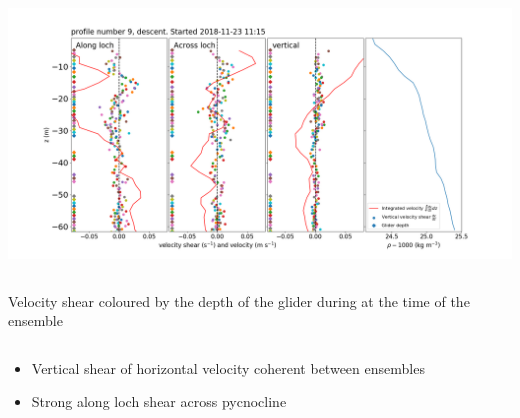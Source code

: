 \documentclass[unknownkeysallowed,usepdftitle=false]{beamer}
\newcommand{\secvariable}{nothing}
\newcommand{\mysection}[1]{\renewcommand{\secvariable}{#1}
}
\begin{document}
\mysection{trial_shear}
\begin{frame}\label{\secvariable}
\includegraphics[trim=70 20 80 80,clip,width=\paperwidth]{figure/95_qc.png}
\vspace*{-5mm}
\begin{columns}
\begin{column}[t]{0.9\textwidth}

\scriptsize Velocity shear coloured by the depth of the glider during at the time of the ensemble
\end{column}
\end{columns}



\begin{itemize}
\item Vertical shear of horizontal velocity coherent between ensembles
\item Strong along loch shear across pycnocline
\end{itemize}
  
\end{frame}
\end{document}
